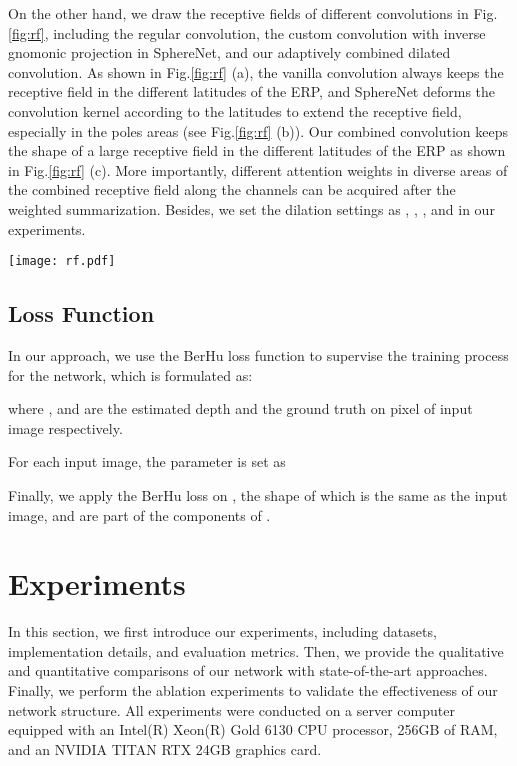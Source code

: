 \documentclass[letterpaper]{article} \usepackage{aaai21}  \usepackage{times}  \usepackage{helvet} \usepackage{courier}  \usepackage[hyphens]{url}  \usepackage{graphicx} \urlstyle{rm} \def\UrlFont{\rm}  \usepackage{natbib}  \usepackage{caption} \frenchspacing  \setlength{\pdfpagewidth}{8.5in}  \setlength{\pdfpageheight}{11in}
\begin{document}
On the other hand, we draw the receptive fields of different convolutions in Fig.\ref{fig:rf}, including the regular  convolution, the custom convolution with inverse gnomonic projection in SphereNet, and our adaptively combined dilated convolution. As shown in Fig.\ref{fig:rf} (a), the vanilla convolution always keeps the  receptive field in the different latitudes of the ERP, and SphereNet deforms the convolution kernel according to the latitudes to extend the receptive field, especially in the poles areas (see Fig.\ref{fig:rf} (b)). Our combined convolution keeps the shape of a large receptive field in the different latitudes of the ERP as shown in Fig.\ref{fig:rf} (c). More importantly, different attention weights in diverse areas of the combined receptive field along the channels can be acquired after the weighted summarization. Besides, we set the dilation settings as , , , and  in our experiments.

\begin{figure*}[tb]
\centering
  \texttt{[image: rf.pdf]}
  \caption{Receptive fields (RF) of different convolutions. In sub-figure (c), the items with the same color in a sub-area of a receptive field have the same interest scores.}
  \label{fig:rf}
\end{figure*}

\subsection{Loss Function}
In our approach, we use the BerHu \cite{DBLP:conf/3dim/LainaRBTN16} loss function to supervise the training process for the network, which is formulated as:


where , and  are the estimated depth and the ground truth on pixel  of input image respectively. 

For each input image, the parameter  is set as


Finally, we apply the BerHu loss on , the shape of which is the same as the input image, and  are part of the components of .


\section{Experiments}
In this section, we first introduce our experiments, including datasets, implementation details, and evaluation metrics. Then, we provide the qualitative and quantitative comparisons of our network with state-of-the-art approaches.
Finally, we perform the ablation experiments to validate the effectiveness of our network structure.
All experiments were conducted on a server computer equipped with an Intel(R) Xeon(R) Gold 6130 CPU processor, 256GB of RAM, and an NVIDIA TITAN RTX 24GB graphics card.
\end{document}
